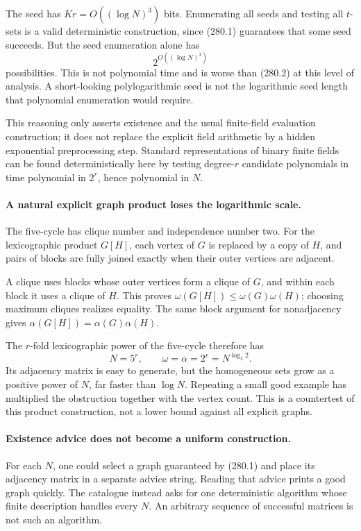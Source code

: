 \documentclass[11pt]{article}
\begin{document}
The seed has $Kr=O((\log N)^3)$ bits. Enumerating all seeds and testing all $t$-sets is a valid deterministic construction, since (280.1) guarantees that some seed succeeds. But the seed enumeration alone has
\[
 2^{O((\log N)^3)}
\]
possibilities. This is not polynomial time and is worse than (280.2) at this level of analysis. A short-looking polylogarithmic seed is not the logarithmic seed length that polynomial enumeration would require.

This reasoning only asserts existence and the usual finite-field evaluation construction; it does not replace the explicit field arithmetic by a hidden exponential preprocessing step. Standard representations of binary finite fields can be found deterministically here by testing degree-$r$ candidate polynomials in time polynomial in $2^r$, hence polynomial in $N$.

\paragraph{A natural explicit graph product loses the logarithmic scale.}
The five-cycle has clique number and independence number two. For the lexicographic product $G[H]$, each vertex of $G$ is replaced by a copy of $H$, and pairs of blocks are fully joined exactly when their outer vertices are adjacent.

A clique uses blocks whose outer vertices form a clique of $G$, and within each block it uses a clique of $H$. This proves
$\omega(G[H])\le\omega(G)\omega(H)$; choosing maximum cliques realizes equality. The same block argument for nonadjacency gives
$\alpha(G[H])=\alpha(G)\alpha(H)$.

The $r$-fold lexicographic power of the five-cycle therefore has
\[
 N=5^r,\qquad \omega=\alpha=2^r=N^{\log_5 2}.
\]
Its adjacency matrix is easy to generate, but the homogeneous sets grow as a positive power of $N$, far faster than $\log N$. Repeating a small good example has multiplied the obstruction together with the vertex count. This is a countertest of this product construction, not a lower bound against all explicit graphs.

\paragraph{Existence advice does not become a uniform construction.}
For each $N$, one could select a graph guaranteed by (280.1) and place its adjacency matrix in a separate advice string. Reading that advice prints a good graph quickly. The catalogue instead asks for one deterministic algorithm whose finite description handles every $N$. An arbitrary sequence of successful matrices is not such an algorithm.
\end{document}
